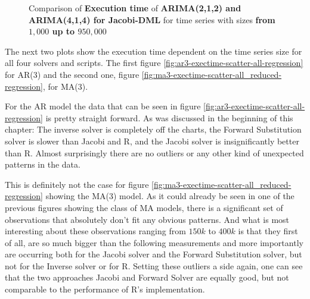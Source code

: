 \begin{figure}[!ht]
	\centering
	\caption{Comparison of \textbf{Execution time} of \textbf{ARIMA(2,1,2) and ARIMA(4,1,4) for Jacobi-DML} for time series with sizes \textbf{from $1,000$ up to $950,000$} }
    \label{fig:arima-comparison-jacobi}
\end{figure}



The next two plots show the execution time dependent on the time series size for all four solvers and scripts. The first figure \ref{fig:ar3-exectime-scatter-all-regression} for \acs{AR}(3) and the second one, figure \ref{fig:ma3-exectime-scatter-all_reduced-regression}, for \acs{MA}(3). 

For the \acl{AR} model the data that can be seen in figure \ref{fig:ar3-exectime-scatter-all-regression} is pretty straight forward. As was discussed in the beginning of this chapter: The inverse solver is completely off the charts, the Forward Substitution solver is slower than Jacobi and R, and the Jacobi solver is insignificantly better than R. Almost surprisingly there are no outliers or any other kind of unexpected patterns in the data. 

This is definitely not the case for figure \ref{fig:ma3-exectime-scatter-all_reduced-regression} showing the \acs{MA}(3) model. As it could already be seen in one of the previous figures showing the class of \acl{MA} models, there is a significant set of observations that absolutely don't fit any obvious patterns. And what is most interesting about these observations ranging from $150k$ to $400k$ is that they first of all, are so much bigger than the following measurements and more importantly are occurring both for the Jacobi solver and the Forward Substitution solver, but not for the Inverse solver or for R. Setting these outliers a side again, one can see that the two approaches Jacobi and Forward Solver are equally good, but not comparable to the performance of R's implementation. 

